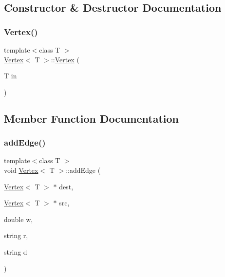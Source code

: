 \subsection{Constructor \& Destructor Documentation}
\mbox{\label{class_vertex_afcbdd4d4198b672356559cb8fa088408}} 
\subsubsection{\texorpdfstring{Vertex()}{Vertex()}}
{\footnotesize\ttfamily template$<$class T $>$ \\
\hyperlink{class_vertex}{Vertex}$<$ T $>$\+::\hyperlink{class_vertex}{Vertex} (\begin{DoxyParamCaption}\item[{T}]{in }\end{DoxyParamCaption})}



\subsection{Member Function Documentation}
\mbox{\label{class_vertex_ad0345b64511f76cbe93a767ec88642b2}} 
\subsubsection{\texorpdfstring{add\+Edge()}{addEdge()}}
{\footnotesize\ttfamily template$<$class T $>$ \\
void \hyperlink{class_vertex}{Vertex}$<$ T $>$\+::add\+Edge (\begin{DoxyParamCaption}\item[{\hyperlink{class_vertex}{Vertex}$<$ T $>$ $\ast$}]{dest,  }\item[{\hyperlink{class_vertex}{Vertex}$<$ T $>$ $\ast$}]{src,  }\item[{double}]{w,  }\item[{string}]{r,  }\item[{string}]{d }\end{DoxyParamCaption})\hspace{0.3cm}{\ttfamily [private]}}

